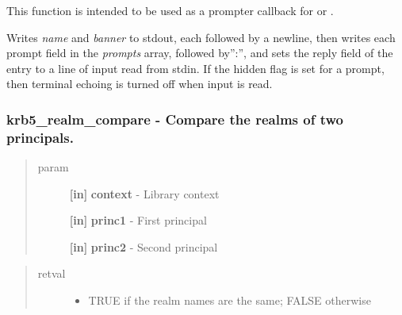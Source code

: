 \documentclass[letterpaper,10pt,english]{sphinxmanual}
\begin{document}
This function is intended to be used as a prompter callback for {\hyperref[appdev/refs/api/krb5_get_init_creds_password:krb5_get_init_creds_password]{}} or {\hyperref[appdev/refs/api/krb5_init_creds_init:krb5_init_creds_init]{}} .

Writes \emph{name} and \emph{banner} to stdout, each followed by a newline, then writes each prompt field in the \emph{prompts} array, followed by'':'', and sets the reply field of the entry to a line of input read from stdin. If the hidden flag is set for a prompt, then terminal echoing is turned off when input is read.


\subsubsection{krb5\_realm\_compare -  Compare the realms of two principals.}
\label{appdev/refs/api/krb5_realm_compare::doc}\label{appdev/refs/api/krb5_realm_compare:krb5-realm-compare-compare-the-realms-of-two-principals}

\begin{fulllineitems}
\label{appdev/refs/api/krb5_realm_compare:krb5_realm_compare}
\end{fulllineitems}

\begin{quote}\begin{description}
\item[{param}] \leavevmode
\textbf{{[}in{]}} \textbf{context} - Library context

\textbf{{[}in{]}} \textbf{princ1} - First principal

\textbf{{[}in{]}} \textbf{princ2} - Second principal

\end{description}\end{quote}
\begin{quote}\begin{description}
\item[{retval}] \leavevmode\begin{itemize}
\item {} 
TRUE   if the realm names are the same; FALSE otherwise

\end{itemize}

\end{description}\end{quote}
\end{document}
